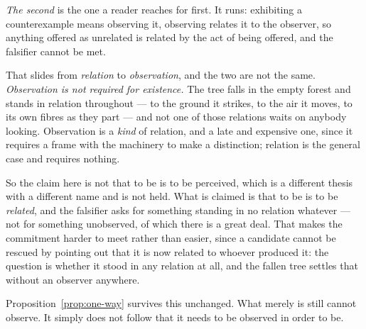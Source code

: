\documentclass[11pt,a4paper]{article}
\begin{document}
\emph{The second} is the one a reader reaches for first. It runs: exhibiting a counterexample means
observing it, observing relates it to the observer, so anything offered as unrelated is related by the
act of being offered, and the falsifier cannot be met.

That slides from \emph{relation} to \emph{observation}, and the two are not the same. \emph{Observation
is not required for existence.} The tree falls in the empty forest and stands in relation throughout ---
to the ground it strikes, to the air it moves, to its own fibres as they part --- and not one of those
relations waits on anybody looking. Observation is a \emph{kind} of relation, and a late and expensive
one, since it requires a frame with the machinery to make a distinction; relation is the general case
and requires nothing.

So the claim here is not that to be is to be perceived, which is a different thesis with a different
name and is not held. What is claimed is that to be is to be \emph{related}, and the falsifier asks for
something standing in no relation whatever --- not for something unobserved, of which there is a great
deal. That makes the commitment harder to meet rather than easier, since a candidate cannot be rescued
by pointing out that it is now related to whoever produced it: the question is whether it stood in any
relation at all, and the fallen tree settles that without an observer anywhere.

Proposition~\ref{prop:one-way} survives this unchanged. What merely is still cannot observe. It simply
does not follow that it needs to be observed in order to be.
\end{document}
